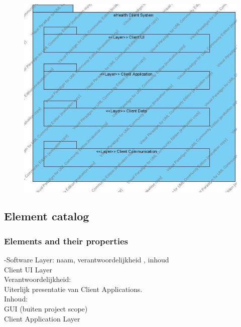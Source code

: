 \documentclass[a4paper,10pt]{article}
\begin{document}
\begin{center}
    \begin{figure}[h!]
      \includegraphics[width=\textwidth]{../images/LayeredView_Client.jpg}
    \end{figure}
  \end{center}

\subsection{Element catalog}

\subsubsection{Elements and their properties}

-Software Layer: naam, verantwoordelijkheid , inhoud\\

Client UI Layer\\

Verantwoordelijkheid:\\
Uiterlijk presentatie van Client Applications.\\

Inhoud:\\
GUI (buiten project scope)\\

Client Application Layer\\
\end{document}
